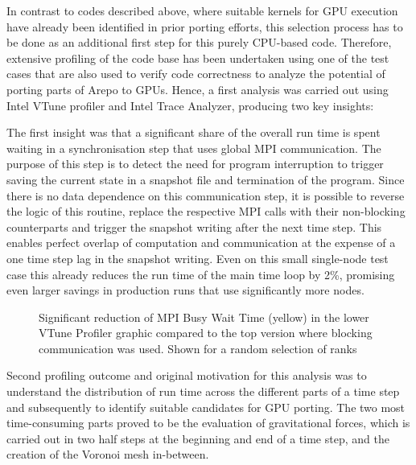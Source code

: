 In contrast to codes described above, where suitable kernels for GPU execution have already been identified in prior porting efforts, this selection process has to be done as an additional first step for this purely CPU-based code. Therefore, extensive profiling of the code base has been undertaken using one of the test cases that are also used to verify code correctness to analyze the potential of porting parts of Arepo to GPUs. Hence, a first analysis was carried out using Intel VTune profiler and Intel Trace Analyzer, producing two key insights:

The first insight was that a significant share of the overall run time is spent waiting in a synchronisation step that uses global MPI communication. The purpose of this step is to detect the need for program interruption to trigger saving the current state in a snapshot file and termination of the program. Since there is no data dependence on this communication step, it is possible to reverse the logic of this routine, replace the respective MPI calls with their non-blocking counterparts and trigger the snapshot writing after the next time step. This enables perfect overlap of computation and communication at the expense of a one time step lag in the snapshot writing. Even on this small single-node test case this already reduces the run time of the main time loop by 2\%, promising even larger savings in production runs that use significantly more nodes.

\begin{figure}[htp]
	\centering
	\caption{Significant reduction of MPI Busy Wait Time (yellow) in the lower VTune Profiler graphic compared to the top version where blocking communication was used. Shown for a random selection of ranks}
	\label{fig:arepo_mpicom}
\end{figure}

Second profiling outcome and original motivation for this analysis was to understand the distribution of run time across the different parts of a time step and subsequently to identify suitable candidates for GPU porting. The two most time-consuming parts proved to be the evaluation of gravitational forces, which is carried out in two half steps at the beginning and end of a time step, and the creation of the Voronoi mesh in-between.

